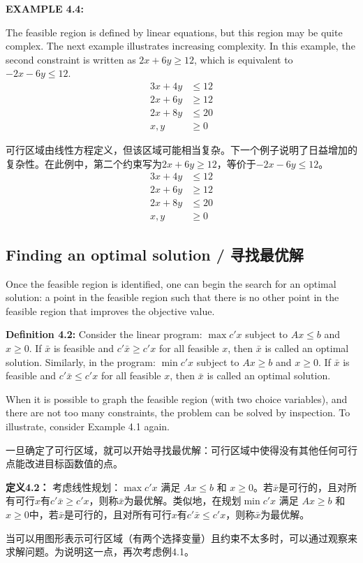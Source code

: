 \bigskip
\noindent\textbf{EXAMPLE 4.4:}
\begin{original}
The feasible region is defined by linear equations, but this region may be quite complex. The next example illustrates increasing complexity. In this example, the second constraint is written as $2x + 6y \ge 12$, which is equivalent to $-2x - 6y \le 12$.
\[
\begin{aligned}
3x + 4y &\le 12 \\
2x + 6y &\ge 12 \\
2x + 8y &\le 20 \\
x, y &\ge 0
\end{aligned}
\]
\end{original}
\begin{translation}
可行区域由线性方程定义，但该区域可能相当复杂。下一个例子说明了日益增加的复杂性。在此例中，第二个约束写为$2x + 6y \ge 12$，等价于$-2x - 6y \le 12$。
\[
\begin{aligned}
3x + 4y &\le 12 \\
2x + 6y &\ge 12 \\
2x + 8y &\le 20 \\
x, y &\ge 0
\end{aligned}
\]
\end{translation}

\subsection{Finding an optimal solution / 寻找最优解}

\begin{original}
Once the feasible region is identified, one can begin the search for an optimal solution: a point in the feasible region such that there is no other point in the feasible region that improves the objective value.

\textbf{Definition 4.2:} Consider the linear program: $\max c'x$ subject to $Ax \le b$ and $x \ge 0$. If $\bar{x}$ is feasible and $c'\bar{x} \ge c'x$ for all feasible $x$, then $\bar{x}$ is called an optimal solution. Similarly, in the program: $\min c'x$ subject to $Ax \ge b$ and $x \ge 0$. If $\bar{x}$ is feasible and $c'\bar{x} \le c'x$ for all feasible $x$, then $\bar{x}$ is called an optimal solution.

When it is possible to graph the feasible region (with two choice variables), and there are not too many constraints, the problem can be solved by inspection. To illustrate, consider Example 4.1 again.
\end{original}
\begin{translation}
一旦确定了可行区域，就可以开始寻找最优解：可行区域中使得没有其他任何可行点能改进目标函数值的点。

\textbf{定义4.2：} 考虑线性规划：$\max c'x$ 满足 $Ax \le b$ 和 $x \ge 0$。若$\bar{x}$是可行的，且对所有可行$x$有$c'\bar{x} \ge c'x$，则称$\bar{x}$为最优解。类似地，在规划$\min c'x$ 满足 $Ax \ge b$ 和 $x \ge 0$中，若$\bar{x}$是可行的，且对所有可行$x$有$c'\bar{x} \le c'x$，则称$\bar{x}$为最优解。

当可以用图形表示可行区域（有两个选择变量）且约束不太多时，可以通过观察来求解问题。为说明这一点，再次考虑例4.1。
\end{translation}

